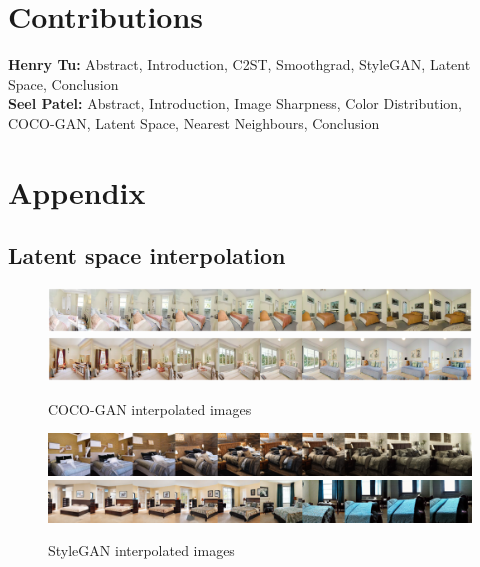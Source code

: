 \documentclass{article}
\begin{document}
    \section{Contributions}
    \textbf{Henry Tu:} Abstract, Introduction, C2ST, Smoothgrad, StyleGAN, Latent Space, Conclusion\\
    \textbf{Seel Patel:} Abstract, Introduction, Image Sharpness, Color Distribution, COCO-GAN, Latent Space, Nearest Neighbours, Conclusion
    
    
    \newpage
    \section{Appendix}
    \subsection{Latent space interpolation}

    \begin{figure}[H]
          \centering
          \includegraphics[scale=0.145]{latent-space/coco_latent_ex.png}
          \includegraphics[scale=0.145]{latent-space/cocogan_latent_interesting.png}
          \caption{COCO-GAN interpolated images}
    \end{figure}
     \begin{figure}[H]
          \centering
          \includegraphics[scale=0.4]{latent-space/stylegan_latent_1.png}
          \includegraphics[scale=0.4]{latent-space/stylegan_latent_2.png}
          \caption{StyleGAN interpolated images}
    \end{figure} 
    \newpage
\end{document}
